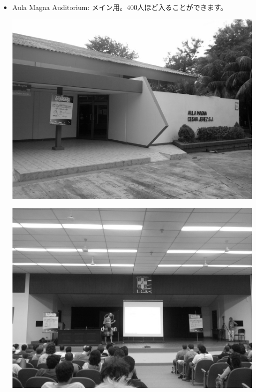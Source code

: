 \documentclass[mingoth,a4paper]{jsarticle}
\begin{document}
\begin{itemize}
  \item Aula Magna Auditorium: メイン用。400人ほど入ることができます。\\
	\begin{minipage}{0.4\hsize}
	\includegraphics[width=0.8\hsize]{image201208/debconf12_maintalk01_mono.jpg}
        \end{minipage}
        \begin{minipage}{0.4\hsize}
        \includegraphics[width=0.8\hsize]{image201208/debconf12_maintalk02_mono.jpg}
	\end{minipage}


\end{itemize}
\end{document}
